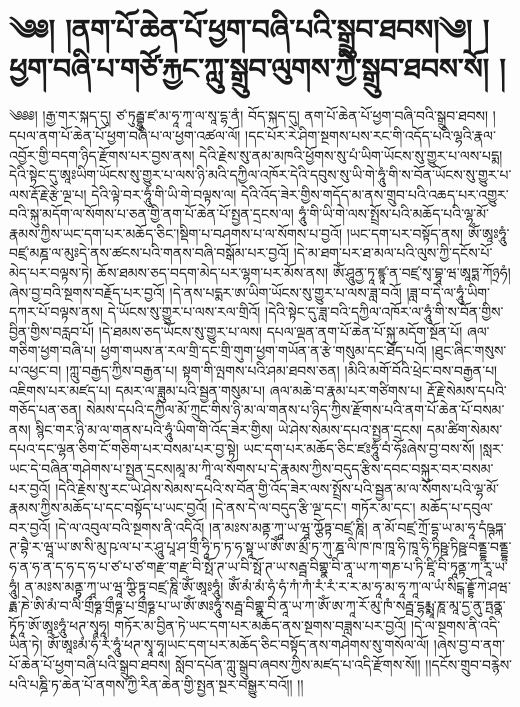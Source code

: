 \setcounter{footnote}{0} 
\chapter{༄༅། །ནག་པོ་ཆེན་པོ་ཕྱག་བཞི་པའི་སྒྲུབ་ཐབས།༄། །ཕྱག་བཞི་པ་གཙོ་རྐྱང་ཀླུ་སྒྲུབ་ལུགས་ཀྱི་སྒྲུབ་ཐབས་སོ། ། }༄༅༅། །རྒྱ་གར་སྐད་དུ། ཙ་ཏུརྦྷུ་ཛ་མ་ཧཱ་ཀཱ་ལ་སཱ་དྷ་ནཾ། བོད་སྐད་དུ། ནག་པོ་ཆེན་པོ་ཕྱག་བཞི་བའི་སྒྲུབ་ཐབས། །དཔལ་ནག་པོ་ཆེན་པོ་ཕྱག་བཞི་པ་ལ་ཕྱག་འཚལ་ལོ། །དང་པོར་རེ་ཤིག་སྔགས་པས་རང་གི་འདོད་པའི་ལྷའི་རྣལ་འབྱོར་གྱི་བདག་ཉིད་རྫོགས་པར་བྱས་ནས། དེའི་རྗེས་སུ་ནམ་མཁའི་ཕྱོགས་སུ་པཾ་ཡིག་ཡོངས་སུ་གྱུར་པ་ལས་པདྨ། དེའི་སྟེང་དུ་ཨཱཿཡིག་ཡོངས་སུ་གྱུར་པ་ལས་ཉི་མའི་དཀྱིལ་འཁོར་དེའི་དབུས་སུ་ཡི་གེ་ཧཱུཾ་གི་ས་བོན་ཡོངས་སུ་གྱུར་པ་ལས་རྡོ་རྗེ་རྩེ་ལྔ་པ། དེའི་ལྟེ་བར་ཧཱུཾ་གི་ཡི་གེ་བལྟས་ལ། དེའི་འོད་ཟེར་གྱིས་གདོད་མ་ནས་གྲུབ་པའི་འཆད་པར་འགྱུར་བའི་སྐུ་མདོག་ལ་སོགས་པ་ཅན་གྱི་ནག་པོ་ཆེན་པོ་སྤྱན་དྲངས་ལ། ཧཱུཾ་གི་ཡི་གེ་ལས་སྤྲོས་པའི་མཆོད་པའི་ལྷ་མོ་རྣམས་ཀྱིས་ཡང་དག་པར་མཆོད་ཅིང་།སྡིག་པ་བཤགས་པ་ལ་སོགས་པ་བྱའོ། །ཡང་དག་པར་བསྟོད་ནས། ཨོཾ་ཨཱཿཧཱུཾ་བཛྲ་མཎྜ་ལ་མུཿདེ་ནས་ཚངས་པའི་གནས་བཞི་བསྒོམ་པར་བྱའོ། །དེ་མ་ཐག་པར་ཐ་མལ་པའི་ལུས་ཀྱི་དངོས་པོ་མེད་པར་བལྟས་ཏེ། ཆོས་ཐམས་ཅད་བདག་མེད་པར་ལྷག་པར་མོས་ནས། ཨོཾ་ཤཱུནྱ་ཏཱ་ཛྙཱ་ན་བཛྲ་སྭ་བྷཱ་ཝ་ཨཱཏྨ་ཀོཉྲཧཾ།ཞེས་བྱ་བའི་སྔགས་བརྗོད་པར་བྱའོ། །དེ་ནས་པདྨར་ཨ་ཡིག་ཡོངས་སུ་གྱུར་པ་ལས་ཟླ་བའོ། །ཟླ་བ་དེ་ལ་ཧཱུཾ་ཡིག་དཀར་པོ་བལྟས་ནས། དེ་ཡོངས་སུ་གྱུར་པ་ལས་རལ་གྲིའོ། །དེའི་སྟེང་དུ་ཟླ་བའི་དཀྱིལ་འཁོར་ལ་ཧཱུཾ་གི་ས་བོན་གྱིས་བྱིན་གྱིས་བརླབ་པོ། །དེ་ཐམས་ཅད་ཡོངས་སུ་གྱུར་པ་ལས། དཔལ་ལྡན་ནག་པོ་ཆེན་པོ་སྐུ་མདོག་སྔོན་པོ། ཞལ་གཅིག་ཕྱག་བཞི་པ། ཕྱག་གཡས་ན་རལ་གྲི་དང་གྲི་གུག་ཕྱག་གཡོན་ན་རྩེ་གསུམ་དང་ཐོད་པའོ། །ཐུང་ཞིང་གསུས་པ་འཕྱང་བ། །ཀླུ་བརྒྱད་ཀྱིས་བརྒྱན་པ། སྟག་གི་ལྤགས་པའི་ཤམ་ཐབས་ཅན། །མིའི་མགོ་བོའི་ཕྲེང་བས་བརྒྱན་པ། འཇིགས་པར་མཛད་པ། དམར་ལ་ཟླུམ་པའི་སྦྱན་གསུམ་པ། ཞལ་མཆེ་བ་རྣམ་པར་གཙིགས་པ། རྡོ་རྗེ་སེམས་དཔའི་གཅོད་པན་ཅན། སེམས་དཔའི་དཀྱིལ་མོ་ཀྲུང་གིས་ཉི་མ་ལ་གནས་པ་ཉིད་ཀྱིས་རྫོགས་པའི་ནག་པོ་ཆེན་པོ་བསམ་ནས། སྙིང་གར་ཉི་མ་ལ་གནས་པའི་ཧཱུཾ་ཡིག་གི་འོད་ཟེར་གྱིས། ཡེ་ཤེས་སེམས་དཔའ་སྤྱན་དྲངས། དམ་ཚིག་སེམས་དཔའ་དང་ལྷན་ཅིག་ངོ་གཅིག་པར་བསམ་པར་བྱ་སྟེ། ཡང་དག་པར་མཆོད་ཅིང་ཛཿཧཱུཾ་བཾ་ཧོཿཞེས་བྱ་བས་སོ། །སླར་ཡང་དེ་བཞིན་གཤེགས་པ་སྤྱན་དྲངས།མཱ་མ་ཀཱི་ལ་སོགས་པ་དེ་རྣམས་ཀྱིས་བདུད་རྩིས་དབང་བསྐུར་བར་བསམ་པར་བྱའོ། །དེའི་རྗེས་སུ་རང་ཡེ་ཤེས་སེམས་དཔའི་ས་བོན་གྱི་འོད་ཟེར་ལས་སྤྲོས་པའི་སྦྱན་མ་ལ་སོགས་པའི་ལྷ་མོ་རྣམས་ཀྱིས་མཆོད་པ་དང་བསྟོད་པ་ཡང་བྱའོ། །དེ་ནས་དེ་ལ་བདུད་རྩི་ལྔ་དང་། གཏོར་མ་དང་། མཆོད་པ་དབུལ་བར་བྱའོ། །དེ་ལ་འབུལ་བའི་སྔགས་ནི་འདིའོ། །ན་མཿས་མནྟ་ཀཱ་ཡ་ཝཱ་ཀྩོཏྟ་བཛྲ་ཎཱི། ན་མོ་བཛྲ་ཀྲོ་དྷ་ཡ་མ་ཧཱ་དཾཥྚཏྐ་ཊ་བྷཻ་ར་ཝཱ་ཡ་ཨ་སི་མུ་ཥ་ལ་པ་ར་ཤཱུ་པཱ་ཤ་གྲྀ་ཧཱི་ཏ་ཏ་ཧ་སྟཱ་ཡ་ཨོཾ་ཨ་མྲྀ་ཏ་ཀུ་ཎྜ་ལི་ཁ་ཁ་ཁཱ་ཧི་ཁཱ་ཧི་ཏིཥྛ་ཏིཥྛ་བནྡྷ་བནྡྷ་ཧ་ན་ཧ་ན་ད་ཧ་ད་ཧ་པ་ཙ་པ་ཙ་གརྫ་གརྫ་བི་སྥོ་ཊ་ཡ་བི་སྥོ་ཊ་ཡ་སརྦྦ་བིགྷྣ་བི་ནཱ་ཡ་ཀ་གཎ་པ་ཏི་ཛཱི་བི་ཏཱནྟ་ཀ་རཱ་ཡ་ཧཱུཾ། ན་མཿས་མནྟ་ཀཱ་ཡ་ཝཱ་ཀྩི་ཏྟ་བཛྲ་ཎཱི་ཨོཾ་ཨཱཿཧཱུཾ། ཨོཾ་མཾ་མཾ་ཧཾ་ཧཾ་ཀཾ་ཀཾ་རཾ་རཾ་ར་ར་མ་ཧཱ་མ་ཧཱ་ཀཱ་ལ་ཡཾ་སིངྒ་རྡྷོ་ཀེ་ཤཝ་རྟྨ་ཎེ་ཨི་མཾ་བ་ལིཾ་གྲྀཧྞ་གྲྀཧྞ་པ་གྲྀཧྞ་པ་ཡ་ཨོཾ་ཨཿཧཱུཾ་སརྦྦ་བིགྷྣ་བི་ནཱ་ཡ་ཀ་ཨོཾ་ཨ་ཀཱ་རོ་མུ་ཁཾ་སརྦྦ་དྷརྨྨཱ་ཎཱ་མཱ་དྱ་ནུ་ཏྤནྣ་ཏྭོཏཱ་ཨོ་ཨཱཿཧཱུཾ་ཕཊ་སྭཱཧཱ། གཏོར་མ་བྱིན་ཏེ་ཡང་དག་པར་མཆོད་ནས་སྔགས་བཟླས་པར་བྱའོ། །དེ་ལ་སྔགས་ནི་འདི་ཡིན་ཏེ། ཨོཾ་ཨཱཿམཾ་ཧཾ་རཾ་ཧཱུཾ་ཕཊ་སྭཱ་ཧཱ།ཡང་དག་པར་མཆོད་ཅིང་བསྟོད་ནས་གཤེགས་སུ་གསོལ་ལོ། །ཞེས་བྱ་བ་ནག་པོ་ཆེན་པོ་ཕྱག་བཞི་པའི་སྒྲུབ་ཐབས། སློབ་དཔོན་ཀླུ་སྒྲུབ་ཞབས་ཀྱིས་མཛད་པ་འདི་རྫོགས་སོ།། །།དངོས་གྲུབ་བརྙེས་པའི་པཎྜི་ཏ་ཆེན་པོ་ནགས་ཀྱི་རིན་ཆེན་གྱི་སྤྱན་སྔར་བསྒྱུར་བའོ།། །།